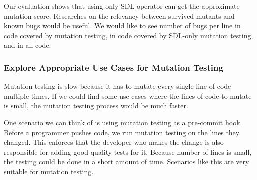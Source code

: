\documentclass[12pt]{article}
\begin{document}
Our evaluation shows that using only SDL operator can get the approximate mutation score. Researches on the relevancy between survived mutants and known bugs would be useful. We would like to see number of bugs per line in code covered by mutation testing, in code covered by SDL-only mutation testing, and in all code.

\subsubsection{Explore Appropriate Use Cases for Mutation Testing}

Mutation testing is slow because it has to mutate every single line of code multiple times. If we could find some use cases where the lines of code to mutate is small, the mutation testing process would be much faster.

One scenario we can think of is using mutation testing as a pre-commit hook. Before a programmer pushes code, we run mutation testing on the lines they changed. This enforces that the developer who makes the change is also responsible for adding good quality tests for it. Because number of lines is small, the testing could be done in a short amount of time. Scenarios like this are very suitable for mutation testing.

\begin{appendices}
\end{appendices}



\end{document}
